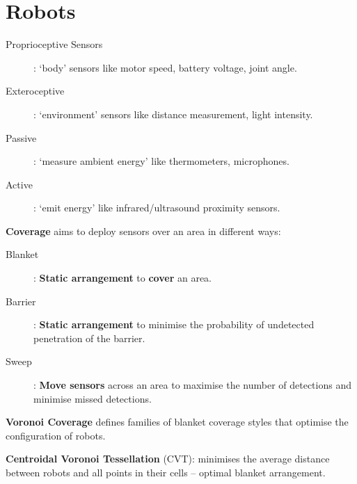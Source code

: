 \documentclass[a4paper, 11pt]{article}
\begin{document}
\section*{Robots}
{
    \begin{description}
    \item[Proprioceptive Sensors]: `body' sensors like motor speed, battery voltage, joint angle.
    \item[Exteroceptive]: `environment' sensors like distance measurement, light intensity.
    \item[Passive]: `measure ambient energy' like thermometers, microphones.
    \item[Active]: `emit energy' like infrared/ultrasound proximity sensors.
    \end{description}

    \textbf{Coverage} aims to deploy sensors over an area in different ways:
    \begin{description}
    \item[Blanket]: \textbf{Static arrangement} to \textbf{cover} an area.
    \item[Barrier]: \textbf{Static arrangement} to minimise the probability of undetected penetration of the barrier.
    \item[Sweep]: \textbf{Move sensors} across an area to maximise the number of detections and minimise missed detections.
    \end{description}

    \textbf{Voronoi Coverage} defines families of blanket coverage styles that optimise the configuration of robots.

    \textbf{Centroidal Voronoi Tessellation} (CVT): minimises the average distance between robots and all points in their cells -- optimal blanket arrangement.
}
\end{document}
